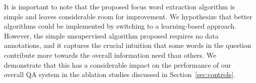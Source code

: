 It is important to note that the proposed focus word extraction algorithm is simple and leaves considerable room for improvement. We hypothesize that better algorithms could be implemented by switching to a learning-based approach. However, the simple unsupervised algorithm proposed requires no data annotations, and it captures the crucial intuition that some words in the question  contribute more towards the overall information need than others.  We demonstrate that this has a considerable impact on the performance of our overall QA system in the ablation studies discussed in Section~\ref{sec:controls}.




